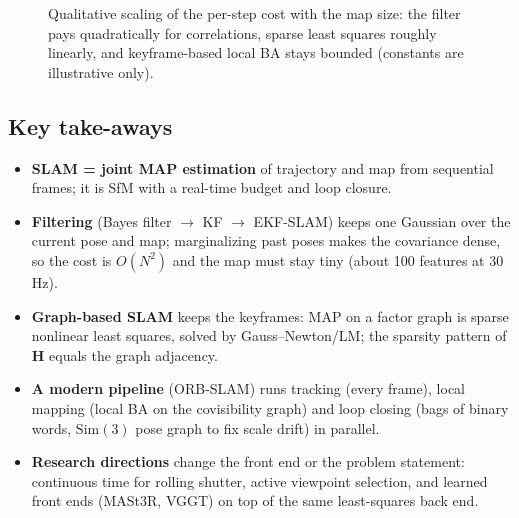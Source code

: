 \documentclass[11pt,a4paper]{article}
\newcommand{\bH}{\mathbf{H}}
\newcommand{\Sim}{\mathrm{Sim}(3)}
\begin{document}
\begin{figure}[htbp]\centering
{}
\caption{Qualitative scaling of the per-step cost with the map size: the filter pays quadratically for correlations, sparse least squares roughly linearly, and keyframe-based local BA stays bounded (constants are illustrative only).}
\end{figure}

\subsection*{Key take-aways}
\begin{itemize}
\item \textbf{SLAM = joint MAP estimation} of trajectory and map from sequential frames; it is SfM with a real-time budget and loop closure.
\item \textbf{Filtering} (Bayes filter $\to$ KF $\to$ EKF-SLAM) keeps one Gaussian over the current pose and map; marginalizing past poses makes the covariance dense, so the cost is $O(N^2)$ and the map must stay tiny (about 100 features at 30\,Hz).
\item \textbf{Graph-based SLAM} keeps the keyframes: MAP on a factor graph is sparse nonlinear least squares, solved by Gauss--Newton/LM; the sparsity pattern of $\bH$ equals the graph adjacency.
\item \textbf{A modern pipeline} (ORB-SLAM) runs tracking (every frame), local mapping (local BA on the covisibility graph) and loop closing (bags of binary words, $\Sim$ pose graph to fix scale drift) in parallel.
\item \textbf{Research directions} change the front end or the problem statement: continuous time for rolling shutter, active viewpoint selection, and learned front ends (MASt3R, VGGT) on top of the same least-squares back end.
\end{itemize}
\end{document}
